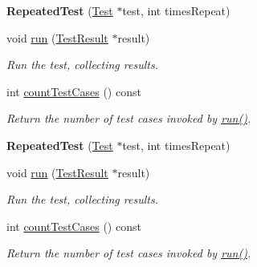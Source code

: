 \begin{DoxyCompactItemize}
\item 
\hypertarget{class_repeated_test_a73cf84a81085a1e93f21f2f4d2a14bc6}{{\bfseries Repeated\+Test} (\hyperlink{class_test}{Test} $\ast$test, int times\+Repeat)}\label{class_repeated_test_a73cf84a81085a1e93f21f2f4d2a14bc6}

\item 
\hypertarget{class_repeated_test_a6faffcd29b619305a75dd4c1995beaad}{void \hyperlink{class_repeated_test_a6faffcd29b619305a75dd4c1995beaad}{run} (\hyperlink{class_test_result}{Test\+Result} $\ast$result)}\label{class_repeated_test_a6faffcd29b619305a75dd4c1995beaad}

\begin{DoxyCompactList}\small\item\em Run the test, collecting results. \end{DoxyCompactList}\item 
int \hyperlink{class_repeated_test_a6ba58feb083e24fea828c2f7975d5478}{count\+Test\+Cases} () const 
\begin{DoxyCompactList}\small\item\em Return the number of test cases invoked by \hyperlink{class_repeated_test_a6faffcd29b619305a75dd4c1995beaad}{run()}. \end{DoxyCompactList}\item 
\hypertarget{class_repeated_test_a73cf84a81085a1e93f21f2f4d2a14bc6}{{\bfseries Repeated\+Test} (\hyperlink{class_test}{Test} $\ast$test, int times\+Repeat)}\label{class_repeated_test_a73cf84a81085a1e93f21f2f4d2a14bc6}

\item 
\hypertarget{class_repeated_test_a6faffcd29b619305a75dd4c1995beaad}{void \hyperlink{class_repeated_test_a6faffcd29b619305a75dd4c1995beaad}{run} (\hyperlink{class_test_result}{Test\+Result} $\ast$result)}\label{class_repeated_test_a6faffcd29b619305a75dd4c1995beaad}

\begin{DoxyCompactList}\small\item\em Run the test, collecting results. \end{DoxyCompactList}\item 
int \hyperlink{class_repeated_test_a2bacf360b91cc6a0c52ec9e75ceae5a6}{count\+Test\+Cases} () const 
\begin{DoxyCompactList}\small\item\em Return the number of test cases invoked by \hyperlink{class_repeated_test_a6faffcd29b619305a75dd4c1995beaad}{run()}. \end{DoxyCompactList}\end{DoxyCompactItemize}
